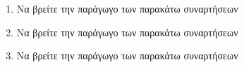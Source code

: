 \begin{enumerate}
\item Να βρείτε την παράγωγο των παρακάτω συναρτήσεων
\begin{multicols}{2}
\end{multicols}

\item Να βρείτε την παράγωγο των παρακάτω συναρτήσεων
\begin{multicols}{2}
\end{multicols}

\item Να βρείτε την παράγωγο των παρακάτω συναρτήσεων
\begin{multicols}{2}
\end{multicols}


\end{enumerate}
